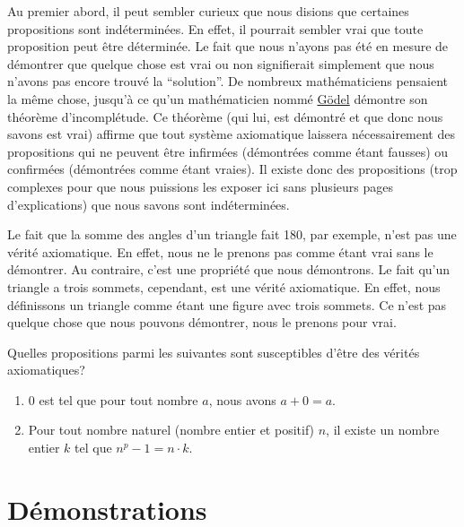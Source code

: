 \begin{pourallerplusloin}
    Au premier abord, il peut sembler curieux que nous disions que certaines propositions sont indéterminées. En effet, il pourrait sembler vrai que toute proposition peut être déterminée. Le fait que nous n'ayons pas été en mesure de démontrer que quelque chose est vrai ou non signifierait simplement que nous n'avons pas encore trouvé la ``solution''. De nombreux mathématiciens pensaient la même chose, jusqu'à ce qu'un mathématicien nommé \href{https://fr.wikipedia.org/wiki/Kurt_Gödel}{Gödel} démontre son théorème d'incomplétude. Ce théorème (qui lui, est démontré et que donc nous savons est vrai) affirme que tout système axiomatique laissera nécessairement des propositions qui ne peuvent être infirmées (démontrées comme étant fausses) ou confirmées (démontrées comme étant vraies). Il existe donc des propositions (trop complexes pour que nous puissions les exposer ici sans plusieurs pages d'explications) que nous savons sont indéterminées.
\end{pourallerplusloin}

Le fait que la somme des angles d'un triangle fait 180\textdegree, par exemple, n'est pas une vérité axiomatique. En effet, nous ne le prenons pas comme étant vrai sans le démontrer. Au contraire, c'est une propriété que nous démontrons. Le fait qu'un triangle a trois sommets, cependant, est une vérité axiomatique. En effet, nous définissons un triangle comme étant une figure avec trois sommets. Ce n'est pas quelque chose que nous pouvons démontrer, nous le prenons pour vrai.

\vspace{1em}

\begin{exercice}
    Quelles propositions parmi les suivantes sont susceptibles d'être des vérités axiomatiques?
    \begin{enumerate}
        \item 0 est tel que pour tout nombre $a$, nous avons $a+0 = a$.
        \item Pour tout nombre naturel (nombre entier et positif) $n$, il existe un nombre entier $k$ tel que $n^p - 1 = n\cdot k$.
    \end{enumerate}
\end{exercice}

\section{Démonstrations}


